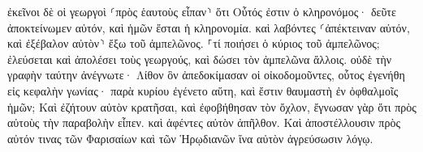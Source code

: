 \documentclass{openreader}
\begin{document}
ἐκεῖνοι δὲ οἱ γεωργοὶ ⸂πρὸς ἑαυτοὺς εἶπαν⸃ ὅτι Οὗτός ἐστιν ὁ κληρονόμος· δεῦτε ἀποκτείνωμεν αὐτόν, καὶ ἡμῶν ἔσται ἡ κληρονομία. 
καὶ λαβόντες ⸂ἀπέκτειναν αὐτόν, καὶ ἐξέβαλον αὐτὸν⸃ ἔξω τοῦ ἀμπελῶνος. 
⸀τί ποιήσει ὁ κύριος τοῦ ἀμπελῶνος; ἐλεύσεται καὶ ἀπολέσει τοὺς γεωργούς, καὶ δώσει τὸν ἀμπελῶνα ἄλλοις. 
οὐδὲ τὴν γραφὴν ταύτην ἀνέγνωτε· Λίθον ὃν ἀπεδοκίμασαν οἱ οἰκοδομοῦντες, οὗτος ἐγενήθη εἰς κεφαλὴν γωνίας· 
παρὰ κυρίου ἐγένετο αὕτη, καὶ ἔστιν θαυμαστὴ ἐν ὀφθαλμοῖς ἡμῶν; 
Καὶ ἐζήτουν αὐτὸν κρατῆσαι, καὶ ἐφοβήθησαν τὸν ὄχλον, ἔγνωσαν γὰρ ὅτι πρὸς αὐτοὺς τὴν παραβολὴν εἶπεν. καὶ ἀφέντες αὐτὸν ἀπῆλθον. 
Καὶ ἀποστέλλουσιν πρὸς αὐτόν τινας τῶν Φαρισαίων καὶ τῶν Ἡρῳδιανῶν ἵνα αὐτὸν ἀγρεύσωσιν λόγῳ. 
\end{document}
